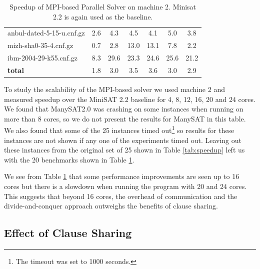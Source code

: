 \documentclass[letterpaper, compsoc, conference]{IEEEtran}
\begin{document}
\begin{table}[htbp]
\begin{center}
\begin{tabular}{|l|c|c|c|c|c|c|}
      anbul-dated-5-15-u.cnf.gz &                2.6 &  4.3 &  4.5 &  4.1 &  5.0 &  3.8 \\
      mizh-sha0-35-4.cnf.gz &                    0.7 &  2.8 & 13.0 & 13.1 &  7.8 &  2.2 \\
      ibm-2004-29-k55.cnf.gz &                   8.3 & 29.6 & 23.3 & 24.6 & 25.6 & 21.2 \\
      \hline
      \textbf{total}  &                          1.8 &  3.0 &  3.5 &  3.6 &  3.0 &  2.9 \\
      \hline
    \end{tabular}
    \end{center}
    \caption{Speedup of MPI-based Parallel Solver on machine 2. Minisat 2.2 is again
    used as the baseline.}
    \label{tab:scalability}
\end{table}

To study the scalability of the MPI-based solver we used machine 2 and measured
speedup over the MiniSAT 2.2 baseline for 4, 8, 12, 16, 20 and 24 cores. We
found that ManySAT2.0 was crashing on some instances when running on more than
8 cores, so we do not present the results for ManySAT in this table. We also
found that some of the 25 instances timed out\footnote{The timeout was set to
1000 seconds.} so results for these instances are not shown if any one of the
experiments timed out. Leaving out these instances from the original set of 25
shown in Table \ref{tab:speedup} left us with the 20 benchmarks shown in Table
\ref{tab:scalability}. 

We see from Table \ref{tab:scalability} that some performance improvements are
seen up to 16 cores but there is a slowdown when running the program with 20
and 24 cores. This suggests that beyond 16 cores, the overhead of communication
and the divide-and-conquer approach outweighs the benefits of clause sharing.

\subsection{Effect of Clause Sharing}
\label{sec:sharing effects}
\end{document}
